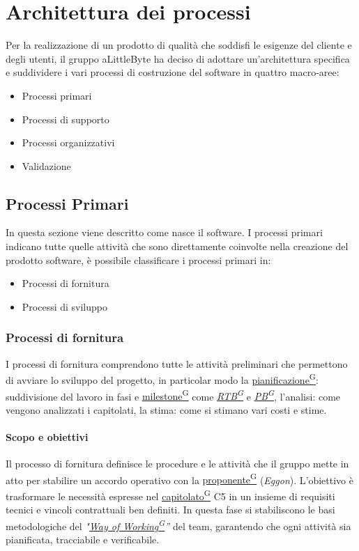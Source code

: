 \documentclass[a4paper,12pt]{article}
\providecommand{\glslink}[2]{\href{https://alittlebyte-19.github.io/Documentazione/glossario.html\#gls-#1}{\underline{#2}\textsuperscript{\scriptsize G}}}
\begin{document}
\section{Architettura dei processi}
Per la realizzazione di un prodotto di qualità che soddisfi le esigenze del cliente e degli utenti, il gruppo aLittleByte ha deciso di adottare un'architettura specifica e suddividere i vari processi di costruzione del software in quattro macro-aree:
\begin{itemize}
    \item Processi primari
    \item Processi di supporto
    \item Processi organizzativi
    \item Validazione
\end{itemize}

\subsection{Processi Primari}
In questa sezione viene descritto come nasce il software. I processi primari indicano tutte quelle attività che sono direttamente coinvolte nella creazione del prodotto software, è possibile classificare i processi primari in:
\begin{itemize}
    \item Processi di fornitura 
    \item Processi di sviluppo
\end{itemize}

\subsubsection{Processi di fornitura}
I processi di fornitura comprendono tutte le attività preliminari che permettono di avviare lo sviluppo del progetto, in particolar modo la \glslink{pianificazione}{pianificazione}: suddivisione del lavoro in fasi e \glslink{milestone}{milestone} come \textit{\glslink{rtb-requirements-and-technology-baseline}{RTB}} e \textit{\glslink{pb-product-baseline}{PB}}, l’analisi: come vengono analizzati i capitolati, la stima: come si stimano vari costi e stime.

\paragraph{Scopo e obiettivi}
Il processo di fornitura definisce le procedure e le attività che il gruppo mette in atto per stabilire un accordo operativo con la \glslink{committente-proponente}{proponente} (\textit{Eggon}). L'obiettivo è trasformare le necessità espresse nel \glslink{capitolato}{capitolato} C5 in un insieme di requisiti tecnici e vincoli contrattuali ben definiti. In questa fase si stabiliscono le basi metodologiche del \textit{"\glslink{way-of-working-wow}{Way of Working}''} del team, garantendo che ogni attività sia pianificata, tracciabile e verificabile.
\end{document}
